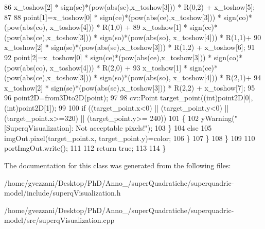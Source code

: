 \begin{DoxyCode}
86                                 x\_toshow[2] * sign(se)*(pow(abs(se),x\_toshow[3])) * R(0,2) + x\_toshow[5];
87 
88                  point[1]=x\_toshow[0] * sign(ce)*(pow(abs(ce),x\_toshow[3])) * sign(co)*(pow(abs(co),
      x\_toshow[4])) * R(1,0) +
89                             x\_toshow[1] * sign(ce)*(pow(abs(ce),x\_toshow[3])) * sign(so)*(pow(abs(so),
      x\_toshow[4])) * R(1,1)+
90                                 x\_toshow[2] * sign(se)*(pow(abs(se),x\_toshow[3])) * R(1,2) + x\_toshow[6];
91 
92                  point[2]=x\_toshow[0] * sign(ce)*(pow(abs(ce),x\_toshow[3])) * sign(co)*(pow(abs(co),
      x\_toshow[4])) * R(2,0) +
93                             x\_toshow[1] * sign(ce)*(pow(abs(ce),x\_toshow[3])) * sign(so)*(pow(abs(so),
      x\_toshow[4])) * R(2,1)+
94                                 x\_toshow[2] * sign(se)*(pow(abs(se),x\_toshow[3])) * R(2,2) + x\_toshow[7];
95 
96                  point2D=from3Dto2D(point);
97 
98                  cv::Point target\_point((\textcolor{keywordtype}{int})point2D[0],(\textcolor{keywordtype}{int})point2D[1]);
99 
100                  \textcolor{keywordflow}{if} ((target\_point.x<0) || (target\_point.y<0) || (target\_point.x>=320) || (target\_point.y>=
      240))
101                  \{
102                      yWarning(\textcolor{stringliteral}{"[SuperqVisualization]: Not acceptable pixels!"});
103                  \}
104                  \textcolor{keywordflow}{else}
105                     imgOut.pixel(target\_point.x, target\_point.y)=color;
106              \}
107          \}
108     \}
109 
110     portImgOut.write();
111 
112     \textcolor{keywordflow}{return} \textcolor{keyword}{true};
113 
114 \}
\end{DoxyCode}


The documentation for this class was generated from the following files\-:\begin{DoxyCompactItemize}
\item 
/home/gvezzani/\-Desktop/\-Ph\-D/\-Anno\-\_/super\-Quadratiche/superquadric-\/model/include/superq\-Visualization.\-h\item 
/home/gvezzani/\-Desktop/\-Ph\-D/\-Anno\-\_/super\-Quadratiche/superquadric-\/model/src/superq\-Visualization.\-cpp\end{DoxyCompactItemize}
